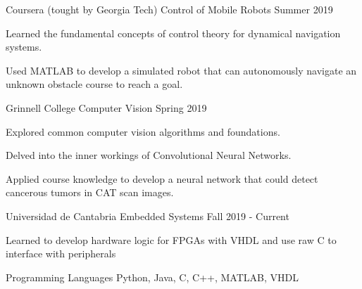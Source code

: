 \documentclass[12pt, a4paper]{awesome-cv}
\begin{document}
\begin{cventries}

    \cventry
	{Coursera (tought by Georgia Tech)}
	{Control of Mobile Robots}
	{}
	{Summer 2019}
	{
	  \begin{cvitems}
		\item{Learned the fundamental concepts of control theory for dynamical navigation systems.}
		\item{Used MATLAB to develop a simulated robot that can autonomously navigate an unknown obstacle course to reach a goal.}
	  \end{cvitems}
	}

    \cventry
	{Grinnell College}
	{Computer Vision}
	{}
	{Spring 2019}
	{
	  \begin{cvitems}
		\item{Explored common computer vision algorithms and foundations.}
		\item{Delved into the inner workings of Convolutional Neural Networks.}
		\item{Applied course knowledge to develop a neural network that could detect cancerous tumors in CAT scan images.}
	  \end{cvitems}
	}

    \cventry
	{Universidad de Cantabria}
	{Embedded Systems}
	{}
	{Fall 2019 - Current}
	{
	  \begin{cvitems}
		\item{Learned to develop hardware logic for FPGAs with VHDL and use raw C to interface with peripherals}
	  \end{cvitems}
	}

\end{cventries}

\begin{cvskills}
  \cvskill
    {Programming Languages} 
    {Python, Java, C, C++, MATLAB, VHDL} 

\end{cvskills}
\end{document}
